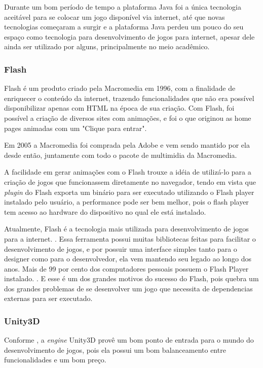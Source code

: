 Durante um bom período de tempo a plataforma Java foi a única tecnologia
aceitável para se colocar um jogo disponível via internet, até que
novas tecnologias começaram a surgir e a plataforma Java perdeu um pouco do seu
espaço como tecnologia para desenvolvimento de jogos para internet,
apesar dele ainda ser utilizado por alguns, principalmente no meio
acadêmico.

\subsubsection{Flash}

Flash é um produto criado pela Macromedia em 1996, com a finalidade de
enriquecer o conteúdo da internet, trazendo funcionalidades que não
era possível disponibilizar apenas com HTML na época de sua criação.
Com Flash, foi possível a criação de diversos sites com animações, e
foi o que originou as home pages animadas com um "Clique para entrar".

Em 2005 a Macromedia foi comprada pela Adobe e vem sendo mantido por
ela desde então, juntamente com todo o pacote de multimidia da
Macromedia.

A facilidade em gerar animações com o Flash trouxe a idéia de
utilizá-lo para a criação de jogos que funcionassem diretamente no
navegador, tendo em vista que \textit{plugin} do Flash exporta um binário para ser
executado utilizando o Flash player instalado pelo usuário, a
performance pode ser bem melhor, pois o flash player tem acesso ao
hardware do dispositivo no qual ele está instalado.

Atualmente, Flash é a tecnologia mais utilizada para desenvolvimento de jogos para a
internet. \cite{website:adobeflashleading}. Essa ferramenta possui muitas
bibliotecas feitas para facilitar o desenvolvimento de jogos, e por
possuir uma interface simples tanto para o designer como para o desenvolvedor,
ela vem mantendo seu legado ao longo dos anos.
Mais de 99 por cento dos computadores pessoais possuem o Flash Player
instalado. \cite{website:adobeflashpenetration}. E esse é um dos grandes
motivos do sucesso do Flash, pois quebra um dos grandes problemas de
se desenvolver um jogo que necessita de dependencias externas para ser
executado.

\subsubsection{Unity3D}

Conforme , a \textit{engine} Unity3D provê
um bom ponto de entrada para o mundo do desenvolvimento de jogos, pois
ela possui um bom balanceamento entre funcionalidades e um bom preço.


